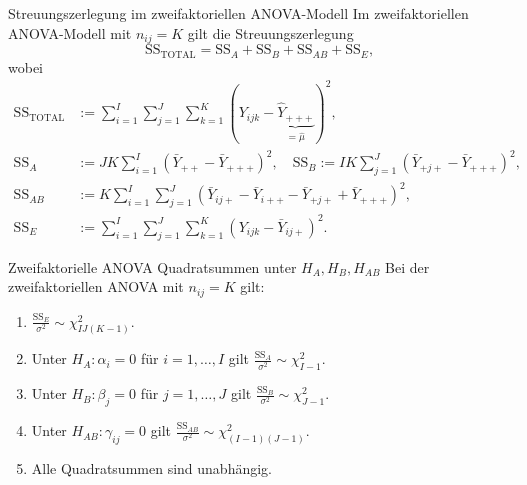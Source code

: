 \begin{karte}{Streuungszerlegung im zweifaktoriellen ANOVA-Modell}
Im zweifaktoriellen ANOVA-Modell mit \(n_{ij}=K\) gilt die Streuungszerlegung 
\[ \mathrm{SS}_{\mathrm{TOTAL}} = \mathrm{SS}_A + \mathrm{SS}_B + \mathrm{SS}_{AB} + \mathrm{SS}_E, \]
wobei 
\begin{align*}
    \mathrm{SS}_{\mathrm{TOTAL}} &:= \sum_{i=1}^I \sum_{j=1}^J \sum_{k=1}^K (Y_{ijk} - \underbrace{\hat{Y}_{+++}}_{=\hat{\mu}})^2,\\
    \mathrm{SS}_A &:= JK \sum_{i=1}^I (\bar{Y}_{++} - \bar{Y}_{+++})^2, \quad \mathrm{SS}_B := IK \sum_{j=1}^J (\bar{Y}_{+j+} - \bar{Y}_{+++})^2, \\
    \mathrm{SS}_{AB} &:= K \sum_{i=1}^I \sum_{j=1}^J (\bar{Y}_{ij+} - \bar{Y}_{i++} - \bar{Y}_{+j+} + \bar{Y}_{+++})^2, \\
    \mathrm{SS}_E &:= \sum_{i=1}^I \sum_{j=1}^J \sum_{k=1}^K (Y_{ijk} - \bar{Y}_{ij+})^2.
\end{align*}
\end{karte}

\begin{karte}{Zweifaktorielle ANOVA Quadratsummen unter \(H_A, H_B, H_{AB}\)}
Bei der zweifaktoriellen ANOVA mit \( n_{ij} = K \) gilt: 
\begin{enumerate}
    \item \(\frac{\mathrm{SS}_E}{\sigma^2} \sim \chi_{IJ (K-1)}^2\).
    \item Unter \(H_A: \alpha_i = 0\) für \( i = 1, \ldots, I\) gilt \( \frac{\mathrm{SS}_A}{\sigma^2} \sim \chi_{I-1}^2\).
    \item Unter \(H_B: \beta_j = 0\) für \(j=1, \ldots, J\) gilt \(\frac{\mathrm{SS}_B}{\sigma^2} \sim \chi_{J-1}^2\).
    \item Unter \(H_{AB} : \gamma_{ij} = 0\) gilt \(\frac{\mathrm{SS}_{AB}}{\sigma^2} \sim \chi_{(I-1)(J-1)}^2\).
    \item Alle Quadratsummen sind unabhängig.
\end{enumerate}
\end{karte}